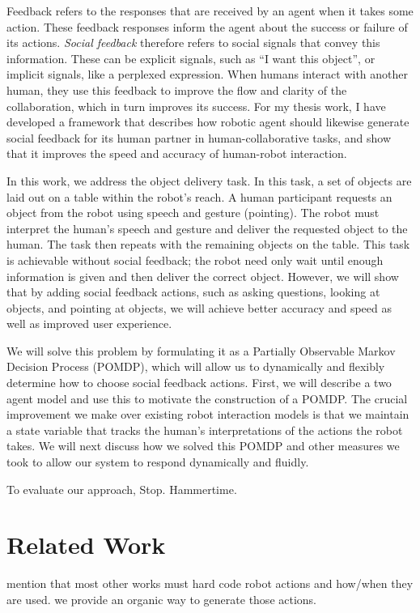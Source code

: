 \documentclass{article}
\begin{document}
Feedback refers to the responses that are received by an agent when it takes some action. These feedback responses inform the agent about the success or failure of its actions. \emph{Social feedback} therefore refers to social signals that convey this information. These can be explicit signals, such as ``I want this object'', or implicit signals, like a perplexed expression. When humans interact with another human, they use this feedback to improve the flow and clarity of the collaboration, which in turn improves its success. For my thesis work, I have developed a framework that describes how robotic agent should likewise generate social feedback for its human partner in human-collaborative tasks, and show that it improves the speed and accuracy of human-robot interaction. 

In this work, we address the object delivery task. In this task, a set of objects are laid out on a table within the robot's reach. A human participant requests an object from the robot using speech and gesture (pointing). The robot must interpret the human's speech and gesture and deliver the requested object to the human. The task then repeats with the remaining objects on the table. This task is achievable without social feedback; the robot need only wait until enough information is given and then deliver the correct object. However, we will show that by adding social feedback actions, such as asking questions, looking at objects, and pointing at objects, we will achieve better accuracy and speed as well as improved user experience. 

We will solve this problem by formulating it as a Partially Observable Markov Decision Process (POMDP)\citep{kaelbling10}, which will allow us to dynamically and flexibly determine how to choose social feedback actions. First, we will describe a two agent model and use this to motivate the construction of a POMDP. The crucial improvement we make over existing robot interaction models is that we maintain a state variable that tracks the human's interpretations of the actions the robot takes. We will next discuss how we solved this POMDP and other measures we took to allow our system to respond dynamically and fluidly. 

To evaluate our approach, Stop. Hammertime. 


\section{Related Work}

mention that most other works must hard code robot actions and how/when they are used. we provide an organic way to generate those actions. 
\end{document}
